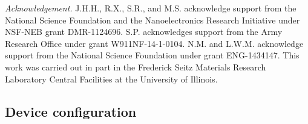 \documentclass[edeposit,fullpage,draftthesis]{uiucthesis2009}
\begin{document}



\textit{Acknowledgement.} J.H.H., R.X., S.R., and M.S. acknowledge support from the National Science Foundation and the Nanoelectronics Research Initiative under NSF-NEB grant DMR-1124696.
S.P. acknowledges support from the Army Research Office under grant W911NF-14-1-0104. N.M. and L.W.M. acknowledge support from the National Science Foundation under grant ENG-1434147. This work was carried out in part in the Frederick Seitz Materials Research Laboratory Central Facilities at the University of Illinois.


    \subsection{Device configuration}
\end{document}
